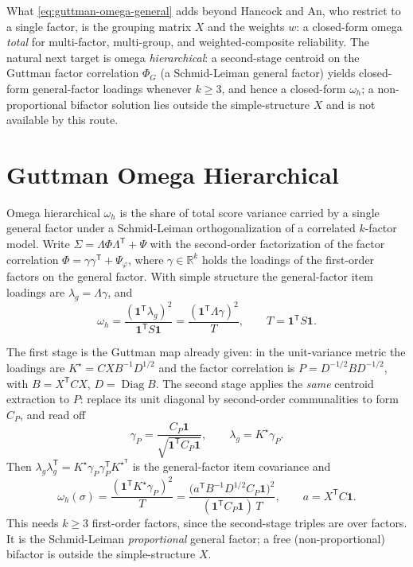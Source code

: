 \documentclass[11pt]{article}
\newcommand{\T}{^{\mathsf T}}
\theoremstyle{plain}
\theoremstyle{remark}
\begin{document}
What \eqref{eq:guttman-omega-general} adds beyond Hancock and An, who restrict
to a single factor, is the grouping matrix \(X\) and the weights \(w\): a
closed-form omega \emph{total} for multi-factor, multi-group, and
weighted-composite reliability. The natural next target is omega
\emph{hierarchical}: a second-stage centroid on the Guttman factor correlation
\(\Phi_G\) (a Schmid-Leiman general factor) yields closed-form general-factor
loadings whenever \(k\ge 3\), and hence a closed-form \(\omega_h\); a
non-proportional bifactor solution lies outside the simple-structure \(X\) and is
not available by this route.

\section{Guttman Omega Hierarchical}

Omega hierarchical \(\omega_h\) is the share of total score variance carried by a
single general factor under a Schmid-Leiman \cite{schmidleiman1957}
orthogonalization of a correlated \(k\)-factor model. Write
\(\Sigma=\Lambda\Phi\Lambda\T+\Psi\) with the second-order factorization of the
factor correlation \(\Phi=\gamma\gamma\T+\Psi_\varphi\), where
\(\gamma\in\mathbb{R}^k\) holds the loadings of the first-order factors on the
general factor. With simple structure the general-factor item loadings are
\(\lambda_g=\Lambda\gamma\), and
\[
  \omega_h=\frac{(\mathbf 1\T\lambda_g)^2}{\mathbf 1\T S\mathbf 1}
    =\frac{(\mathbf 1\T\Lambda\gamma)^2}{T},\qquad T=\mathbf 1\T S\mathbf 1 .
\]

The first stage is the Guttman map already given: in the unit-variance metric the
loadings are \(K^\star=CXB^{-1}D^{1/2}\) and the factor correlation is
\(P=D^{-1/2}BD^{-1/2}\), with \(B=X\T C X\), \(D=\operatorname{Diag}B\). The second
stage applies the \emph{same} centroid extraction to \(P\): replace its unit
diagonal by second-order communalities to form \(C_P\), and read off
\[
  \gamma_P=\frac{C_P\mathbf 1}{\sqrt{\mathbf 1\T C_P\mathbf 1}},\qquad
  \lambda_g=K^\star\gamma_P .
\]
Then \(\lambda_g\lambda_g\T=K^\star\gamma_P\gamma_P\T K^{\star\T}\) is the
general-factor item covariance and
\begin{equation}\label{eq:omega-h}
  \omega_h(\sigma)
    =\frac{(\mathbf 1\T K^\star\gamma_P)^2}{T}
    =\frac{\bigl(a\T B^{-1}D^{1/2}C_P\mathbf 1\bigr)^2}
          {(\mathbf 1\T C_P\mathbf 1)\,T},\qquad a=X\T C\mathbf 1 .
\end{equation}
This needs \(k\ge3\) first-order factors, since the second-stage triples are over
factors. It is the Schmid-Leiman \emph{proportional} general factor; a free
(non-proportional) bifactor is outside the simple-structure \(X\).
\end{document}
